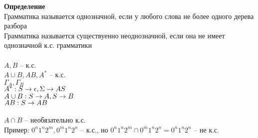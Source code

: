 \documentclass[12pt]{article}
\begin{document}
\textbf{Определение}\\
Грамматика называется однозначной, если у любого слова не более одного дерева разбора\\
Грамматика называется существуенно неоднозначной, если она не имеет однозначной к.с. грамматики\\\\
$A, B$ -- к.с.\\
$A\cup B, AB, A^*$ -- к.с.\\
$\Gamma_A, \Gamma_B$\\
$A^*: S\rightarrow \epsilon, \Sigma\rightarrow AS$\\
$A\cup B: S\rightarrow A, S\rightarrow B$\\
$AB: S\rightarrow AB$\\\\
$A \cap B$ -- необязательно к.с.\\
Пример: $0^n1^n2^m, 0^m1^n2^n$ -- к.с., но $0^n1^n2^m\cap 0^m1^n2^n = 0^n1^n2^n$ -- не к.с.\\
\end{document}
